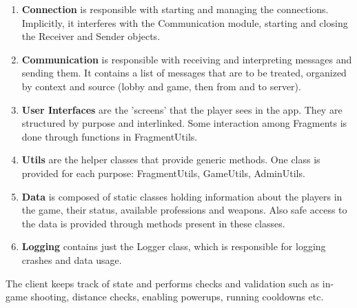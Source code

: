 \documentclass{article}
\begin{document}
\begin{enumerate}
  \item \textbf{Connection} is responsible with starting and managing the
  connections. Implicitly, it interferes with the Communication module, starting
  and closing the Receiver and Sender objects.
  
  \item \textbf{Communication} is responsible with receiving and interpreting
  messages and sending them. It contains a list of messages that are to be
  treated, organized by context and source (lobby and game, then from and to
  server).
  
  \item \textbf{User Interfaces} are the 'screens' that the player sees in the
  app. They are structured by purpose and interlinked. Some interaction among
  Fragments is done through functions in FragmentUtils.
  
  \item \textbf{Utils} are the helper classes that provide generic methods.
  One class is provided for each purpose: FragmentUtils, GameUtils, AdminUtils.
  
  \item \textbf{Data} is composed of static classes holding information about
  the players in the game, their status, available professions and weapons. Also
  safe access to the data is provided through methods present in these classes.
  
  \item \textbf{Logging} contains just the Logger class, which is responsible
  for logging crashes and data usage.
\end{enumerate}

The client keeps track of state and performs checks and validation such as
in-game shooting, distance checks, enabling powerups, running cooldowns
etc.\newline
\end{document}
